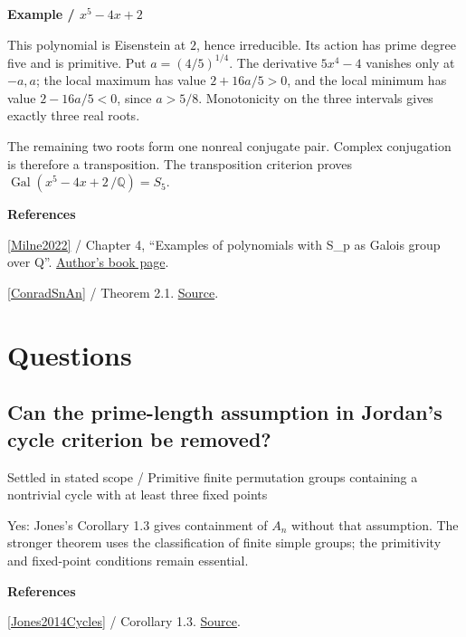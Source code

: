 \documentclass[11pt,a4paper,oneside,openany]{book}
\newenvironment{sources}{\par\smallskip\begingroup\footnotesize\color{atlasgray}\leftskip=10pt\setlength{\parskip}{2pt}}{\par\endgroup\smallskip}
\begin{document}
\begin{atlasblock}[standard]
\textbf{\sffamily Example  /  \(x^5-4x+2\)}\par\smallskip
\color{black} This polynomial is Eisenstein at \(2\), hence irreducible. Its action has prime degree five and is primitive. Put \(a=(4/5)^{1/4}\). The derivative \(5x^4-4\) vanishes only at \(-a,a\); the local maximum has value \(2+16a/5>0\), and the local minimum has value \(2-16a/5<0\), since \(a>5/8\). Monotonicity on the three intervals gives exactly three real roots.\par
\color{black} The remaining two roots form one nonreal conjugate pair. Complex conjugation is therefore a transposition. The transposition criterion proves \(\operatorname{Gal}(x^5-4x+2\,/\mathbb Q)=S_5\).\par
\end{atlasblock}\color{black}
\begin{sources}
\textbf{References}\par\smallskip
\noindent\hyperlink{ref:Milne2022}{[Milne2022]} / Chapter 4, ``Examples of polynomials with S\_\allowbreak{}p as Galois group over Q''.  \href{https://www.jmilne.org/math/Books/index.html}{Author's book page}.\par
\noindent\hyperlink{ref:ConradSnAn}{[ConradSnAn]} / Theorem 2.1.  \href{https://kconrad.math.uconn.edu/blurbs/galoistheory/galoisSnAn.pdf}{Source}.\par
\end{sources}\color{black}
\section*{Questions}
\subsection*{Can the prime-length assumption in Jordan's cycle criterion be removed?}
{\small\sffamily\color{atlasgold}Settled in stated scope / Primitive finite permutation groups containing a nontrivial cycle with at least three fixed points}\par\smallskip
\color{black} Yes: Jones's Corollary 1.3 gives containment of \(A_n\) without that assumption. The stronger theorem uses the classification of finite simple groups; the primitivity and fixed-point conditions remain essential.\par
\begin{sources}
\textbf{References}\par\smallskip
\noindent\hyperlink{ref:Jones2014Cycles}{[Jones2014Cycles]} / Corollary 1.3.  \href{https://doi.org/10.1017/S000497271300049X}{Source}.\par
\end{sources}\color{black}
\end{document}
